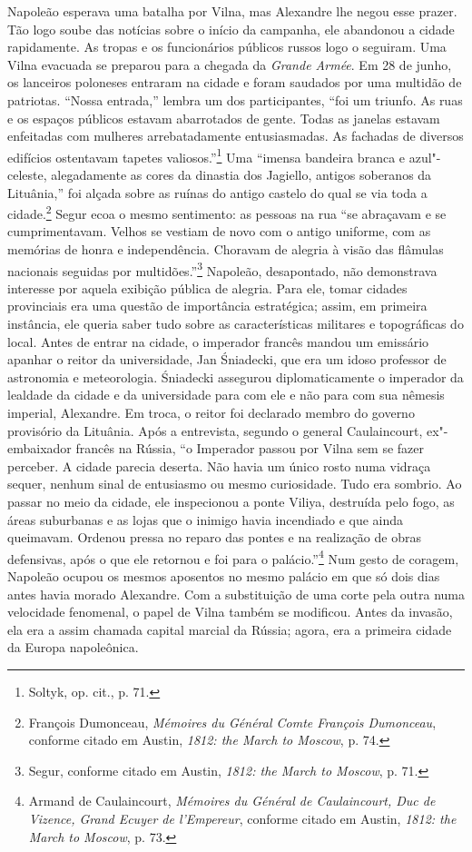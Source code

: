 Napoleão esperava uma batalha por Vilna, mas Alexandre lhe negou esse
prazer. Tão logo soube das notícias sobre o início da campanha, ele
abandonou a cidade rapidamente. As tropas e os funcionários públicos
russos logo o seguiram. Uma Vilna evacuada se preparou para a chegada da
\textit{Grande Armée}. Em 28 de junho, os lanceiros poloneses entraram na
cidade e foram saudados por uma multidão de patriotas. ``Nossa
entrada,'' lembra um dos participantes, ``foi um triunfo. As ruas e os
espaços públicos estavam abarrotados de gente. Todas as janelas estavam
enfeitadas com mulheres arrebatadamente entusiasmadas. As fachadas de
diversos edifícios ostentavam tapetes valiosos.''\footnote{Soltyk, op. cit., p. 71.} Uma ``imensa bandeira branca e azul"-celeste, alegadamente as cores da dinastia dos Jagiello, antigos soberanos
da Lituânia,'' foi alçada sobre as ruínas do antigo castelo do qual se
via toda a cidade.\footnote{François Dumonceau, \textit{Mémoires du Général Comte François Dumonceau}, conforme citado em Austin, \textit{1812: the March to Moscow}, p. 74.} Segur ecoa o mesmo sentimento: as pessoas na rua ``se abraçavam e se cumprimentavam. Velhos
se vestiam de novo com o antigo uniforme, com as memórias de honra e
independência. Choravam de alegria à visão das flâmulas nacionais
seguidas por multidões.''\footnote{Segur, conforme citado em Austin, \textit{1812: the March to Moscow}, p. 71.} Napoleão, desapontado, não demonstrava interesse por aquela exibição pública de alegria. Para ele,
tomar cidades provinciais era uma questão de importância estratégica;
assim, em primeira instância, ele queria saber tudo sobre as
características militares e topográficas do local. Antes de entrar na
cidade, o imperador francês mandou um emissário apanhar o reitor da
universidade, Jan Śniadecki, que era um idoso professor de astronomia e
meteorologia. Śniadecki assegurou diplomaticamente o imperador da
lealdade da cidade e da universidade para com ele e não para com sua
nêmesis imperial, Alexandre. Em troca, o reitor foi declarado membro do
governo provisório da Lituânia. Após a entrevista, segundo o general
Caulaincourt, ex"-embaixador francês na Rússia, ``o Imperador passou por
Vilna sem se fazer perceber. A cidade parecia deserta. Não havia um
único rosto numa vidraça sequer, nenhum sinal de entusiasmo ou mesmo
curiosidade. Tudo era sombrio. Ao passar no meio da cidade, ele
inspecionou a ponte Viliya, destruída pelo fogo, as áreas suburbanas e as
lojas que o inimigo havia incendiado e que ainda queimavam. Ordenou
pressa no reparo das pontes e na realização de obras defensivas, após o
que ele retornou e foi para o palácio.''\footnote{Armand de Caulaincourt, \textit{Mémoires du Général de Caulaincourt, Duc de Vizence, Grand Ecuyer de l'Empereur}, conforme citado em Austin, \textit{1812: the March to Moscow}, p. 73.} Num gesto de coragem, Napoleão ocupou os mesmos aposentos no mesmo palácio em que só dois dias
antes havia morado Alexandre. Com a substituição de uma corte pela outra
numa velocidade fenomenal, o papel de Vilna também se modificou. Antes
da invasão, ela era a assim chamada capital marcial da Rússia; agora,
era a primeira cidade da Europa napoleônica.

